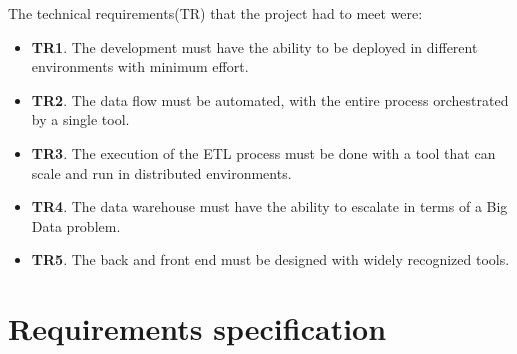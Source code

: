 \nonzeroparskip The technical requirements(TR) that the project had to meet were:
\begin{itemize}
	\item \textbf{TR1}. The development must have the ability to be deployed in different environments with minimum effort.
	\item \textbf{TR2}. The data flow must be automated, with the entire process orchestrated by a single tool.
	\item \textbf{TR3}. The execution of the ETL process must be done with a tool that can scale and run in distributed environments.
	\item \textbf{TR4}. The data warehouse must have the ability to escalate in terms of a Big Data problem.
	\item \textbf{TR5}. The back and front end must be designed with widely recognized tools.
\end{itemize}

\section{Requirements specification}
